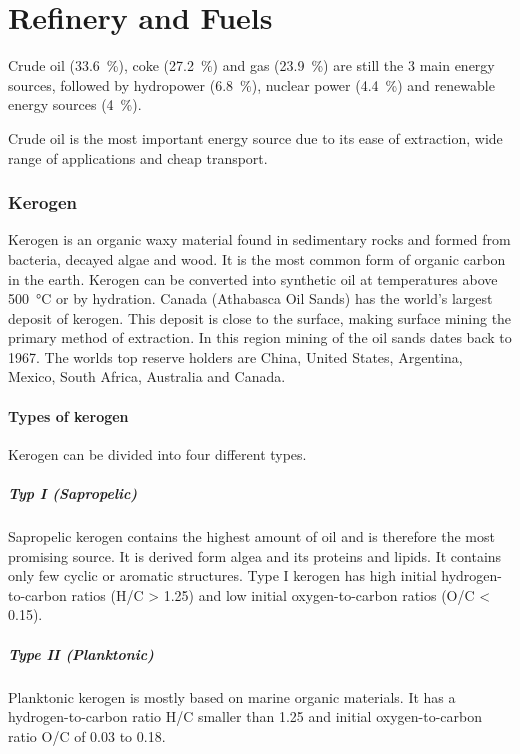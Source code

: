 \part{Refinery and Fuels}
Crude oil (\SI{33.6}{\percent}), coke (\SI{27.2}{\percent}) and gas (\SI{23.9}{\percent}) are still the 3 main energy sources, followed by hydropower (\SI{6.8}{\percent}), nuclear power (\SI{4.4}{\percent}) and renewable energy sources (\SI{4}{\percent}).

Crude oil is the most important energy source due to its ease of extraction, wide range of applications and cheap transport.

\section{Kerogen}
Kerogen is an organic waxy material found in sedimentary rocks and formed from bacteria, decayed algae and wood.
It is the most common form of organic carbon in the earth.
Kerogen can be converted into synthetic oil at temperatures above \SI{500}{\celsius} or by hydration.
Canada (Athabasca Oil Sands) has the world's largest deposit of kerogen.
This deposit is close to the surface, making surface mining the primary method of extraction.
In this region mining of the oil sands dates back to 1967.
The worlds top reserve holders are China, United States, Argentina, Mexico, South Africa, Australia and Canada.

\subsection{Types of kerogen}
Kerogen can be divided into four different types.

\subsubsection{Typ I (Sapropelic)}
Sapropelic kerogen contains the highest amount of oil and is therefore the most promising source.
It is derived form algea and its proteins and lipids.
It contains only few cyclic or aromatic structures.
Type I kerogen has high initial hydrogen-to-carbon ratios (H/C > 1.25) and low initial oxygen-to-carbon ratios (O/C < 0.15).

\subsubsection{Type II (Planktonic)}
Planktonic kerogen is mostly based on marine organic materials.
It has a hydrogen-to-carbon ratio H/C smaller than 1.25 and initial oxygen-to-carbon ratio O/C of 0.03 to 0.18.

